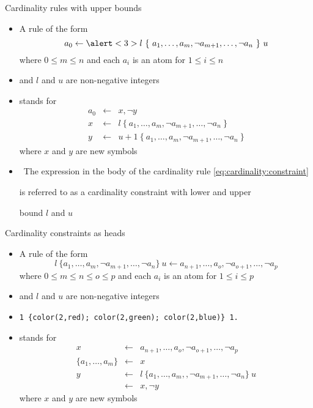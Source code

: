 \begin{frame}{Cardinality rules with upper bounds}
  \begin{itemize}
  \item A rule of the form
    \begin{equation}\label{eq:cardinality:constraint}
      a_0\leftarrow \alert<3>{l~\{\ a_1,\dots,a_m,\neg a_{m+1},\dots,\neg a_n\ \}~u}
    \end{equation}
    where $0\leq m\leq n$ and each $a_i$ is an atom for $1\leq i\leq n$
  \item [] and $l$ and $u$ are non-negative integers
  \item<only@2> []
    stands for
    \[
    \begin{array}{rcl}
      a_0 &\leftarrow& x, \neg y\\
      x   &\leftarrow& l~\{\ a_1,\dots,a_m,\neg a_{m+1},\dots,\neg a_n\ \}\\
      y   &\leftarrow& u{+}1~\{\ a_1,\dots,a_m,\neg a_{m+1},\dots,\neg a_n\ \}
    \end{array}
    \]
    where $x$ and $y$ are new symbols
  \item<only@3>  \
    The expression in the body of the cardinality rule \eqref{eq:cardinality:constraint}

    is referred to as a \alert<3>{cardinality constraint} with lower and upper

    bound $l$ and $u$
  \end{itemize}
\end{frame}
\begin{frame}[fragile]{Cardinality constraints as heads}
  \begin{itemize}
  \item A rule of the form
    \[
    l~\{a_1,\dots,a_m,\neg a_{m+1},\dots,\neg a_n\}~u\leftarrow a_{n+1},\dots,a_o,\neg a_{o+1},\dots,\neg a_p
    \]
    where $0\leq m\leq n\leq o\leq p$ and each $a_i$ is an atom for $1\leq i\leq p$
  \item [] and $l$ and $u$ are non-negative integers
  \item<only@2> 
\begin{lstlisting}[basicstyle=\ttfamily\small]
1 {color(2,red); color(2,green); color(2,blue)} 1.
\end{lstlisting}
  \item<only@3> []
    stands for
    \[
      \begin{array}{rcl}
        x                 &\leftarrow& a_{n+1},\dots,a_o, \neg a_{o+1},\dots,\neg a_p\\
        \{a_1,\dots,a_m\} &\leftarrow& x\\
        y                 &\leftarrow& l~\{a_1,\dots,a_m,,\neg a_{m+1},\dots,\neg a_n\}~u\\
                          &\leftarrow& x, \neg y
      \end{array}
    \]
    where $x$ and $y$ are new symbols
  \end{itemize}
\end{frame}
